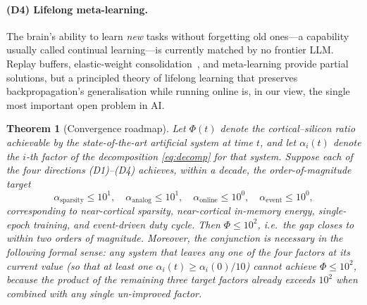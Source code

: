 \documentclass[11pt]{article}
\newtheorem{theorem}{Theorem}
\theoremstyle{definition}
\theoremstyle{remark}
\begin{document}
\paragraph{(D4) Lifelong meta-learning.}
The brain's ability to learn \emph{new} tasks without forgetting old
ones---a capability usually called continual learning---is currently
matched by no frontier LLM.  Replay buffers, elastic-weight
consolidation~\cite{kirkpatrick2017overcoming}, and meta-learning
provide partial solutions, but a principled theory of lifelong
learning that preserves backpropagation's generalisation while
running online is, in our view, the single most important open
problem in AI.

\begin{theorem}[Convergence roadmap]
\label{thm:roadmap}
Let $\Phi(t)$ denote the cortical--silicon ratio achievable by the
state-of-the-art artificial system at time $t$, and let
$\alpha_i(t)$ denote the $i$-th factor of the decomposition
\cref{eq:decomp} for that system.  Suppose each of the four
directions (D1)--(D4) achieves, within a decade, the
order-of-magnitude target
\[
  \alpha_{\mathrm{sparsity}}\le 10^{1},\quad
  \alpha_{\mathrm{analog}}\le 10^{1},\quad
  \alpha_{\mathrm{online}}\le 10^{0},\quad
  \alpha_{\mathrm{event}}\le 10^{0},
\]
corresponding to near-cortical sparsity, near-cortical
in-memory energy, single-epoch training, and event-driven duty cycle.
Then $\Phi\le 10^{2}$, i.e.\ the gap closes to within two orders of
magnitude.  Moreover, the conjunction is \emph{necessary} in the
following formal sense: any system that leaves any one of the four
factors at its current value (so that at least one
$\alpha_i(t)\ge\alpha_i(0)/10$) cannot achieve $\Phi\le 10^{2}$,
because the product of the remaining three target factors already
exceeds $10^{2}$ when combined with any single un-improved factor.
\end{theorem}
\end{document}
